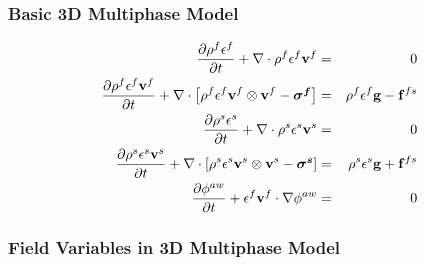 \documentclass{beamer}
\begin{document}
\begin{frame}
\frametitle{Basic 3D Multiphase Model}
\begin{eqnarray}
  \frac{\partial {\rho^f \epsilon^f}}{\partial {t}} + \nabla \cdot \rho^f \epsilon^f {\bf v}^f &=& 0 \\ 
  \frac{\partial {\rho^f \epsilon^f {\bf v}^f }}{\partial {t}} + \nabla \cdot \left[ \rho^f \epsilon^f {\bf v}^f \otimes {\bf v}^f - \mbox{{\boldmath ${\sigma^f}$}} \right]&=& \rho^f \epsilon^f {\bf g}  - {\bf f}^{fs} \\
  \frac{\partial {\rho^s \epsilon^s}}{\partial {t}} + \nabla \cdot \rho^s \epsilon^s {\bf v}^s &=& 0 \\ 
  \frac{\partial {\rho^s \epsilon^s {\bf v}^s}}{\partial {t}} + \nabla \cdot \left[ \rho^s \epsilon^s {\bf v}^s \otimes {\bf v}^s - \mbox{{\boldmath ${\sigma^s}$}} \right] &=& \rho^s \epsilon^s {\bf g}  + {\bf f}^{fs} \\
  \frac{\partial {\phi^{aw}}}{\partial {t}} + \epsilon^f {\bf v}^f \cdot  \nabla \phi^{aw} &=& 0 
\end{eqnarray}
\end{frame}

\begin{frame}
\frametitle{Field Variables in 3D Multiphase Model}
\begin{center}
  \def\svgwidth{\textwidth}
  
\end{center}
\end{frame}



 
\end{document}

